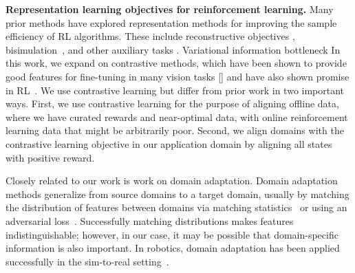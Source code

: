 \documentclass{article}
\begin{document}
\textbf{Representation learning objectives for reinforcement learning.}
Many prior methods have explored representation methods for improving the sample efficiency of RL algorithms. These include reconstructive objectives \cite{lange2010deep, lange2012autonomous, finn2016deep}, bisimulation~\cite{ferns2004bisimulation, castro20bisimulation, zhang2021dbc}, and other auxiliary tasks \cite{jonschkowski2017pve, ghosh2018learning, sax2018midlevel}. 
Variational information bottleneck 
In this work, we expand on contrastive methods, which have been shown to provide good features for fine-tuning in many vision tasks [] and have also shown promise in RL~\cite{laskin2020curl}. 
We use contrastive learning but differ from prior work in two important ways.
First, we use contrastive learning for the purpose of aligning offline data, where we have curated rewards and near-optimal data, with online reinforcement learning data that might be arbitrarily poor.
Second, we align domains with the contrastive learning objective in our application domain by aligning all states with positive reward.

Closely related to our work is work on domain adaptation. Domain adaptation methods generalize from source domains to a target domain, usually by matching the distribution of features between domains via matching statistics~\cite{tzeng2014domainconfusion, sun2016coral, long2015adaptation} or using an adversarial loss~\cite{ganin2016domainadversarial, Bousmalis2016}.
Successfully matching distributions makes features indistinguishable; however, in our case, it may be possible that domain-specific information is also important.
In robotics, domain adaptation has been applied successfully in the sim-to-real setting~\cite{bousmalis2017simtoreal, james218simtosim}.
\end{document}
